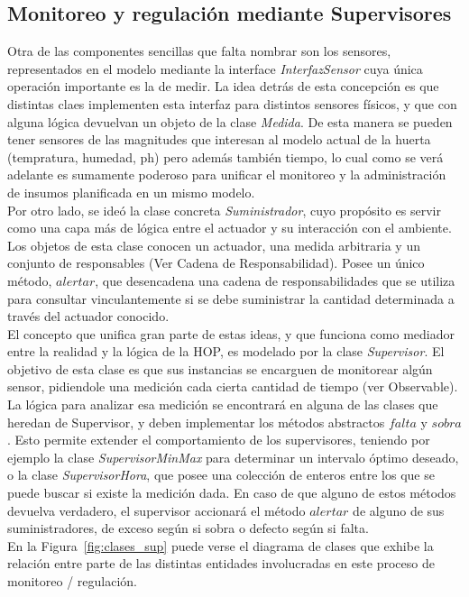 \subsection{Monitoreo y regulación mediante Supervisores}

Otra de las componentes sencillas que falta nombrar son los sensores, representados en el modelo mediante la interface \textsl{InterfazSensor} cuya única operación importante es la de medir. La idea detrás de esta concepción es que distintas claes implementen esta interfaz para distintos sensores físicos, y que con alguna lógica devuelvan un objeto de la clase \textsl{Medida}. De esta manera se pueden tener sensores de las magnitudes que interesan al modelo actual de la huerta (tempratura, humedad, ph) pero además también tiempo, lo cual como se verá adelante es sumamente poderoso para unificar el monitoreo y la administración de insumos planificada en un mismo modelo.\\
\indent Por otro lado, se ideó la clase concreta \textsl{Suministrador}, cuyo propósito es servir como una capa más de lógica entre el actuador y su interacción con el ambiente. Los objetos de esta clase conocen un actuador, una medida arbitraria y un conjunto de responsables (Ver Cadena de Responsabilidad). Posee un único método, $alertar$, que desencadena una cadena de responsabilidades que se utiliza para consultar vinculantemente si se debe suministrar la cantidad determinada a través del actuador conocido.\\ 
\indent El concepto que unifica gran parte de estas ideas, y que funciona como mediador entre la realidad y la lógica de la HOP, es modelado por la clase \textsl{Supervisor}. El objetivo de esta clase es que sus instancias se encarguen de monitorear algún sensor, pidiendole una medición cada cierta cantidad de tiempo (ver Observable). La lógica para analizar esa medición se encontrará en alguna de las clases que heredan de Supervisor, y deben implementar los métodos abstractos $falta$ y $sobra$. Esto permite extender el comportamiento de los supervisores, teniendo por ejemplo la clase \textsl{SupervisorMinMax} para determinar un intervalo óptimo deseado, o la clase \textsl{SupervisorHora}, que posee una colección de enteros entre los que se puede buscar si existe la medición dada. En caso de que alguno de estos métodos devuelva verdadero, el supervisor accionará el método $alertar$ de alguno de sus suministradores, de exceso según si sobra o defecto según si falta.\\
\indent En la Figura~\ref{fig:clases_sup} puede verse el diagrama de clases que exhibe la relación entre parte de las distintas entidades involucradas en este proceso de monitoreo / regulación.


